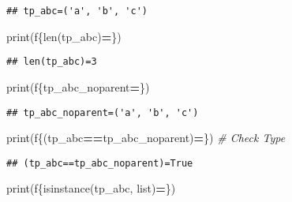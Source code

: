 \documentclass[
]{book}
\newenvironment{Shaded}{\begin{snugshade}}{\end{snugshade}}
\newcommand{\BuiltInTok}[1]{#1}
\newcommand{\CommentTok}[1]{\textcolor[rgb]{0.56,0.35,0.01}{\textit{#1}}}
\newcommand{\NormalTok}[1]{#1}
\newcommand{\OperatorTok}[1]{\textcolor[rgb]{0.81,0.36,0.00}{\textbf{#1}}}
\newcommand{\SpecialCharTok}[1]{\textcolor[rgb]{0.00,0.00,0.00}{#1}}
\newcommand{\SpecialStringTok}[1]{\textcolor[rgb]{0.31,0.60,0.02}{#1}}
\begin{document}
\begin{verbatim}
## tp_abc=('a', 'b', 'c')
\end{verbatim}

\begin{Shaded}
\begin{Highlighting}[]
\BuiltInTok{print}\NormalTok{(}\SpecialStringTok{f\textquotesingle{}}\SpecialCharTok{\{}\BuiltInTok{len}\NormalTok{(tp\_abc)}\OperatorTok{=}\SpecialCharTok{\}}\SpecialStringTok{\textquotesingle{}}\NormalTok{)}
\end{Highlighting}
\end{Shaded}

\begin{verbatim}
## len(tp_abc)=3
\end{verbatim}

\begin{Shaded}
\begin{Highlighting}[]
\BuiltInTok{print}\NormalTok{(}\SpecialStringTok{f\textquotesingle{}}\SpecialCharTok{\{}\NormalTok{tp\_abc\_noparent}\OperatorTok{=}\SpecialCharTok{\}}\SpecialStringTok{\textquotesingle{}}\NormalTok{)}
\end{Highlighting}
\end{Shaded}

\begin{verbatim}
## tp_abc_noparent=('a', 'b', 'c')
\end{verbatim}

\begin{Shaded}
\begin{Highlighting}[]
\BuiltInTok{print}\NormalTok{(}\SpecialStringTok{f\textquotesingle{}}\SpecialCharTok{\{}\NormalTok{(tp\_abc}\OperatorTok{==}\NormalTok{tp\_abc\_noparent)}\OperatorTok{=}\SpecialCharTok{\}}\SpecialStringTok{\textquotesingle{}}\NormalTok{)}
\CommentTok{\# Check Type}
\end{Highlighting}
\end{Shaded}

\begin{verbatim}
## (tp_abc==tp_abc_noparent)=True
\end{verbatim}

\begin{Shaded}
\begin{Highlighting}[]
\BuiltInTok{print}\NormalTok{(}\SpecialStringTok{f\textquotesingle{}}\SpecialCharTok{\{}\BuiltInTok{isinstance}\NormalTok{(tp\_abc, }\BuiltInTok{list}\NormalTok{)}\OperatorTok{=}\SpecialCharTok{\}}\SpecialStringTok{\textquotesingle{}}\NormalTok{)}
\end{Highlighting}
\end{Shaded}
\end{document}

